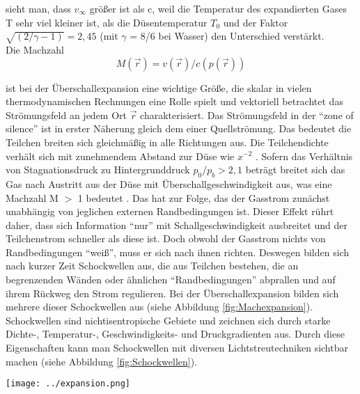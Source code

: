 sieht man, dass $v_{\infty}$ größer ist als c, weil die Temperatur des expandierten Gases T sehr viel kleiner ist, als die Düsentemperatur $T_0$ und der Faktor $\sqrt{(2/\gamma -1)}=2,45$ (mit $\gamma$ = 8/6 bei Wasser) den Unterschied verstärkt.\\
Die Machzahl 
\begin{equation}
M(\vec{r})= v(\vec{r})/c(p(\vec{r}))
\end{equation}

ist bei der Überschallexpansion eine wichtige Größe, die skalar in vielen thermodynamischen Rechnungen eine Rolle spielt und vektoriell betrachtet das Strömungsfeld an jedem Ort $\vec{r}$ charakterisiert. Das Strömungsfeld in der \enquote{zone of silence} ist in erster Näherung gleich dem einer Quellströmung. Das bedeutet die Teilchen breiten sich gleichmäßig in alle Richtungen aus. Die Teilchendichte verhält sich mit zunehmendem Abstand zur Düse wie $x^{-2}$ \cite{hagena1981nucleation}. Sofern das Verhältnis von Stagnationsdruck zu Hintergrunddruck $p_0/p_b > 2,1$ beträgt breitet sich das Gas nach Austritt aus der Düse mit Überschallgeschwindigkeit aus, was eine Machzahl M $>$ 1 bedeutet \cite{scoles1988}. Das hat zur Folge, das der Gasstrom zunächst unabhängig von jeglichen externen Randbedingungen ist. Dieser Effekt rührt daher, dass sich Information \enquote{nur} mit Schallgeschwindigkeit ausbreitet und der Teilchenstrom schneller als diese ist. Doch obwohl der Gasstrom nichts von Randbedingungen \enquote{weiß}, muss er sich nach ihnen richten. Deswegen bilden sich nach kurzer Zeit Schockwellen aus, die aus Teilchen bestehen, die an begrenzenden Wänden oder ähnlichen \enquote{Randbedingungen} abprallen und auf ihrem Rückweg den Strom regulieren. Bei der Überschallexpansion bilden sich mehrere dieser Schockwellen aus (siehe Abbildung \ref{fig:Machexpansion}). Schockwellen sind nichtisentropische Gebiete und zeichnen sich durch starke Dichte-, Temperatur-, Geschwindigkeits- und Druckgradienten aus. Durch diese Eigenschaften kann man Schockwellen mit diversen Lichtstreutechniken sichtbar machen \cite{Mou09} (siehe Abbildung \ref{fig:Schockwellen}).
%
\begin{center}
\begin{minipage}{\linewidth}
\centering
\texttt{[image: ../expansion.png]}%
 \label{fig:Machexpansion}
\end{minipage} 
\end{center} 
